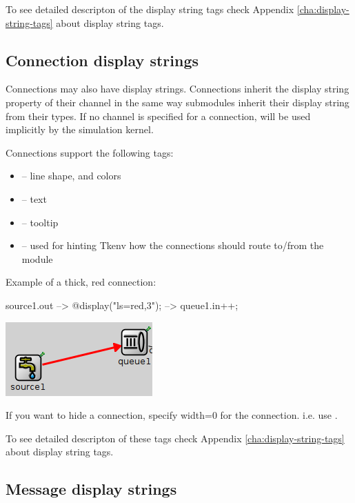 To see detailed descripton of the display string tags check
Appendix \ref{cha:display-string-tags} about display string tags.

\subsection{Connection display strings}

Connections may also have display strings. Connections inherit the
display string property of their channel in the same way submodules inherit
their display string from their types. If no channel is specified for a
connection,  will be used implicitly by the simulation kernel.

Connections support the following tags:
\begin{itemize}
  \item{ -- line shape, and colors}
  \item{ -- text}
  \item{ -- tooltip}
  \item{ -- used for hinting Tkenv how the connections should route to/from the module}
\end{itemize}

Example of a thick, red connection:
\begin{ned}
source1.out --> { @display("ls=red,3"); } --> queue1.in++;
\end{ned}

\begin{center}
\includegraphics{figures/graphics-lstag}
\end{center}

\begin{note}
If you want to hide a connection, specify width=0 for the connection. i.e. use .
\end{note}

To see detailed descripton of these tags check
Appendix \ref{cha:display-string-tags} about display string tags.

\subsection{Message display strings}

